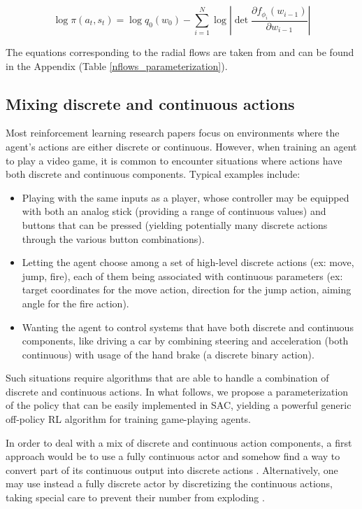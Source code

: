 \documentclass[letterpaper]{article} \usepackage{aaai20}  \usepackage{times}  \usepackage{helvet} \usepackage{courier}  \usepackage[hyphens]{url}  \usepackage{graphicx} \urlstyle{rm} \def\UrlFont{\rm}  \usepackage{graphicx}  \usepackage[section]{placeins}
\begin{document}
\begin{equation}
    \log \pi(a_t, s_t) = \log q_0(w_0) - \sum_{i=1}^{N} \log \left| \det \frac{\partial f_{\phi_i}(w_{i-1})}{\partial w_{i-1}} \right|
\end{equation}

The equations corresponding to the radial flows are taken from \cite{normalizingflows2015} and can be found in the Appendix (Table \ref{nflows_parameterization}).

\subsection{Mixing discrete and continuous actions}

Most reinforcement learning research papers focus on environments where the agent's actions are either discrete or continuous.
However, when training an agent to play a video game, it is common to encounter situations where actions have both discrete and continuous components.
Typical examples include:
\begin{itemize}
    \item Playing with the same inputs as a player, whose controller may be equipped with both an analog stick (providing a range of continuous values) and buttons that can be pressed (yielding potentially many discrete actions through the various button combinations).
    \item Letting the agent choose among a set of high-level discrete actions (ex: move, jump, fire), each of them being associated with continuous parameters (ex: target coordinates for the move action, direction for the jump action, aiming angle for the fire action).
    \item Wanting the agent to control systems that have both discrete and continuous components, like driving a car by combining steering and acceleration (both continuous) with usage of the hand brake (a discrete binary action).
\end{itemize}

Such situations require algorithms that are able to handle a combination of discrete and continuous actions.
In what follows, we propose a parameterization of the policy that can be easily implemented in SAC, yielding a powerful generic off-policy RL algorithm for training game-playing agents.



In order to deal with a mix of discrete and continuous action components, a first approach would be to use a fully continuous actor and somehow find a way to convert part of its continuous output into discrete actions \citep{vanhasselt2009,hausknecht2016,cianflone2019}.
Alternatively, one may use instead a fully discrete actor by discretizing the continuous actions, taking special care to prevent their number from exploding \citep{metz2017,andriotis2018,tang2019}.
\end{document}
